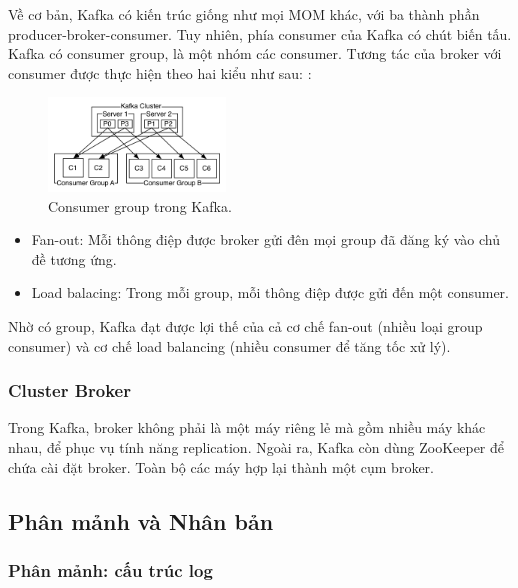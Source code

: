 \documentclass{article}
\begin{document}
Về cơ bản, Kafka có kiến trúc giống như mọi MOM khác, với ba thành phần
producer-broker-consumer. Tuy nhiên, phía consumer của Kafka có chút biến tấu.
Kafka có consumer group, là một nhóm các consumer. Tương tác của broker với
consumer được thực hiện theo hai kiểu như sau: \cite{kafka_intro, kafka_detail}:

\begin{figure}
    \begin{center}
      \includegraphics[width=0.42\textwidth]{consumer_groups.png}
    \end{center}
    \caption{Consumer group trong Kafka.}
\end{figure}

\begin{itemize}
    \item Fan-out: Mỗi thông điệp được broker gửi đên mọi group đã đăng ký vào
    chủ đề tương ứng.
    \item Load balacing: Trong mỗi group, mỗi thông điệp được gửi đến một
    consumer.
\end{itemize}

Nhờ có group, Kafka đạt được lợi thế của cả cơ chế fan-out (nhiều loại group
consumer) và cơ chế load balancing (nhiều consumer để tăng tốc xử lý).

\subsubsection{Cluster Broker}

Trong Kafka, broker không phải là một máy riêng lẻ mà gồm nhiều máy khác nhau,
để phục vụ tính năng replication. Ngoài ra, Kafka còn dùng ZooKeeper để chứa cài
đặt broker. Toàn bộ các máy hợp lại thành một cụm broker.

\subsection{Phân mảnh và Nhân bản}

\subsubsection{Phân mảnh: cấu trúc log}
\end{document}

